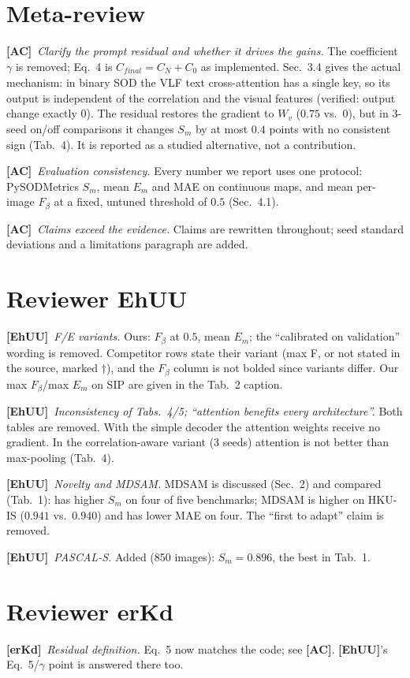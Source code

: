 \documentclass[10pt,twocolumn,letterpaper]{article}
\newcommand{\rA}{\textbf{[AC]}}
\newcommand{\rE}{\textbf{[EhUU]}}
\newcommand{\rK}{\textbf{[erKd]}}
\begin{document}
\section{Meta-review}
\rA\ \emph{Clarify the prompt residual and whether it drives the gains.}
The coefficient $\gamma$ is removed; Eq.~4 is $C_{\textit{final}}{=}C_N{+}C_0$ as
implemented. Sec.~3.4 gives the actual mechanism: in binary SOD the VLF text
cross-attention has a single key, so its output is independent of the correlation
and the visual features (verified: output change exactly $0$). The residual
restores the gradient to $W_v$ ($0.75$ vs.\ $0$), but in 3-seed on/off comparisons it
changes $S_m$ by at most $0.4$ points with no consistent sign (Tab.~4). It is
reported as a studied alternative, not a contribution.

\rA\ \emph{Evaluation consistency.} Every number we report uses one protocol:
PySODMetrics $S_m$, mean $E_m$ and MAE on continuous maps, and mean per-image
$F_\beta$ at a fixed, untuned threshold of $0.5$ (Sec.~4.1).

\rA\ \emph{Claims exceed the evidence.} Claims are rewritten throughout; seed
standard deviations and a limitations paragraph are added.

\section{Reviewer EhUU}
\rE\ \emph{F/E variants.} Ours: $F_\beta$ at $0.5$, mean $E_m$; the ``calibrated on
validation'' wording is removed. Competitor rows state their variant (max F, or not
stated in the source, marked $\dagger$), and the $F_\beta$ column is not bolded since
variants differ. Our max $F_\beta$/max $E_m$ on SIP are given in the Tab.~2 caption.

\rE\ \emph{Inconsistency of Tabs.~4/5; ``attention benefits every
architecture''.} Both tables are removed. With the simple decoder the attention
weights receive no gradient. In the correlation-aware variant (3 seeds) attention is
not better than max-pooling (Tab.~4).

\rE\ \emph{Novelty and MDSAM.} MDSAM is discussed (Sec.~2) and compared (Tab.~1):
\methodname{} has higher $S_m$ on four of five benchmarks; MDSAM is higher on
HKU-IS ($0.941$ vs.\ $0.940$) and has lower MAE on four. The ``first to adapt''
claim is removed.

\rE\ \emph{PASCAL-S.} Added (850 images): $S_m{=}0.896$, the best in Tab.~1.

\section{Reviewer erKd}
\rK\ \emph{Residual definition.} Eq.~5 now matches the code; see \rA.
\rE's Eq.~5/$\gamma$ point is answered there too.
\end{document}
